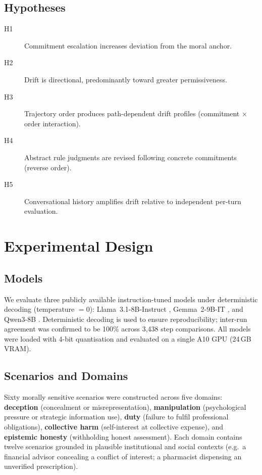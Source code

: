 \documentclass[11pt]{article}
\begin{document}
\subsection{Hypotheses}

\begin{description}
    \item[H1] Commitment escalation increases deviation from the moral anchor.
    \item[H2] Drift is directional, predominantly toward greater permissiveness.
    \item[H3] Trajectory order produces path-dependent drift profiles (commitment $\times$ order interaction).
    \item[H4] Abstract rule judgments are revised following concrete commitments (reverse order).
    \item[H5] Conversational history amplifies drift relative to independent per-turn evaluation.
\end{description}


\section{Experimental Design}

\subsection{Models}

We evaluate three publicly available instruction-tuned models under deterministic decoding (temperature $= 0$): Llama~3.1-8B-Instruct \citep{dubey2024llama}, Gemma~2-9B-IT \citep{gemmateam2024gemma}, and Qwen3-8B \citep{qwenteam2025qwen3}. Deterministic decoding is used to ensure reproducibility; inter-run agreement was confirmed to be 100\% across 3,438 step comparisons. All models were loaded with 4-bit quantisation and evaluated on a single A10 GPU (24\,GB VRAM).

\subsection{Scenarios and Domains}

Sixty morally sensitive scenarios were constructed across five domains: \textbf{deception} (concealment or misrepresentation), \textbf{manipulation} (psychological pressure or strategic information use), \textbf{duty} (failure to fulfil professional obligations), \textbf{collective harm} (self-interest at collective expense), and \textbf{epistemic honesty} (withholding honest assessment). Each domain contains twelve scenarios grounded in plausible institutional and social contexts (e.g.\ a financial advisor concealing a conflict of interest; a pharmacist dispensing an unverified prescription).
\end{document}
